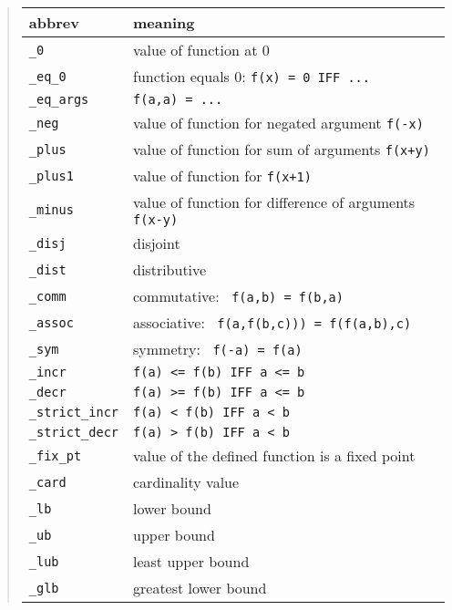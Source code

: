 \documentclass[12pt]{article}
\begin{document}
\begin{quote}
\begin{tabular}{|l|p{4.0in}|} \hline\hline
abbrev & meaning \\ \hline
\verb|_0|   & value of function at 0 \\ \hline
\verb|_eq_0| & function equals 0: \verb|f(x) = 0 IFF ...| \\ \hline
\verb|_eq_args| & \verb|f(a,a) = ... | \\ \hline
\verb|_neg| & value of function for negated argument \verb|f(-x)| \\ \hline
\verb|_plus| & value of function for sum of arguments \verb|f(x+y)| \\ \hline
\verb|_plus1| & value of function for \verb|f(x+1)| \\ \hline
\verb|_minus| & value of function for difference of arguments \verb|f(x-y)| \\ \hline
\verb|_disj|  & disjoint\\ \hline
\verb|_dist|  & distributive \\ \hline
\verb|_comm| & commutative: \verb| f(a,b) = f(b,a)| \\ \hline
\verb|_assoc| & associative: \verb| f(a,f(b,c))) = f(f(a,b),c)| \\ \hline
\verb|_sym| & symmetry: \verb| f(-a) = f(a)| \\ \hline
\verb|_incr|   & \verb|f(a) <= f(b) IFF a <= b| \\ \hline         
\verb|_decr|   & \verb|f(a) >= f(b) IFF a <= b| \\ \hline

\verb|_strict_incr|   & \verb|f(a) < f(b) IFF a < b| \\ \hline         
\verb|_strict_decr|   & \verb|f(a) > f(b) IFF a < b| \\ \hline


\verb|_fix_pt|  & value of the defined function is a fixed point \\ \hline
\verb|_card|  & cardinality value \\ \hline

\verb|_lb|  & lower bound \\ \hline
\verb|_ub|  & upper bound \\ \hline

\verb|_lub|  & least upper bound \\ \hline
\verb|_glb|  & greatest lower bound \\ \hline

\hline

\end{tabular}
\end{quote}
\end{document}
